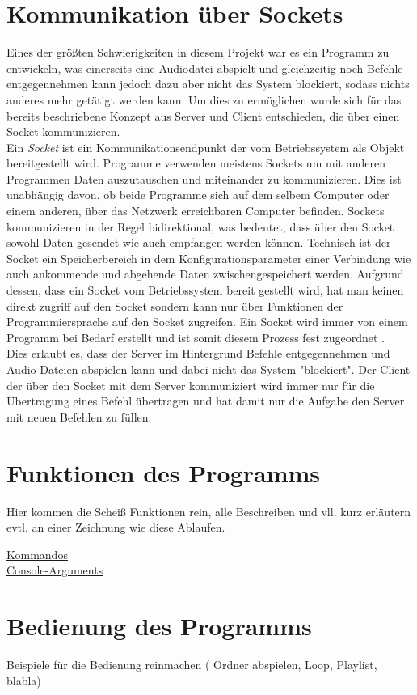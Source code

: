 \section{Kommunikation über Sockets}
Eines der größten Schwierigkeiten in diesem Projekt war es ein Programm zu entwickeln, was einerseits eine Audiodatei abspielt und gleichzeitig noch Befehle entgegennehmen kann jedoch dazu aber nicht das System blockiert, sodass nichts anderes mehr getätigt werden kann. Um dies zu ermöglichen wurde sich für das bereits beschriebene Konzept aus Server und Client entschieden, die über einen Socket kommunizieren. \\
Ein \textit{Socket} ist ein Kommunikationsendpunkt der vom Betriebssystem als Objekt bereitgestellt wird. Programme verwenden meistens Sockets um mit anderen Programmen Daten auszutauschen und miteinander zu kommunizieren. Dies ist unabhängig davon, ob beide Programme sich auf dem selbem Computer oder einem anderen, über das Netzwerk erreichbaren Computer befinden. Sockets kommunizieren in der Regel bidirektional, was bedeutet, dass über den Socket sowohl Daten gesendet wie auch empfangen werden können. Technisch ist der Socket ein Speicherbereich in dem Konfigurationsparameter einer Verbindung wie auch ankommende und abgehende Daten zwischengespeichert werden. Aufgrund dessen, dass ein Socket vom Betriebssystem bereit gestellt wird, hat man keinen direkt zugriff auf den Socket sondern kann nur über Funktionen der Programmiersprache auf den Socket zugreifen.
Ein Socket wird immer von einem Programm bei Bedarf erstellt und ist somit diesem Prozess fest zugeordnet \autocite{pollakowski_2012}. \\
Dies erlaubt es, dass der Server im Hintergrund Befehle entgegennehmen und Audio Dateien abspielen kann und dabei nicht das System "blockiert". Der Client der über den Socket mit dem Server kommuniziert wird immer nur für die Übertragung eines Befehl übertragen und hat damit nur die Aufgabe den Server mit neuen Befehlen zu füllen.

\section{Funktionen des Programms}
Hier kommen die Scheiß Funktionen rein, alle Beschreiben und vll. kurz erläutern evtl. an einer Zeichnung wie diese Ablaufen.

\href{https://github.com/alexanderklapdor/RaspberryPi_Go_Audioplayer#commands-of-the-client}{Kommandos}
\\
\href{https://github.com/alexanderklapdor/RaspberryPi_Go_Audioplayer#console-arguments}{Console-Arguments}


\section{Bedienung des Programms}
Beispiele für die Bedienung reinmachen ( Ordner abspielen, Loop, Playlist, blabla)


